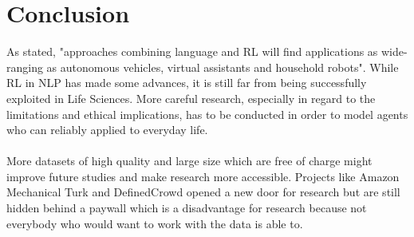 \documentclass[11pt,a4paper]{article}
\begin{document}
\section{Conclusion}
As \citet{luketina-2019-asurvey} stated, "approaches combining language and RL will find applications as wide-ranging as autonomous vehicles, virtual assistants and household robots". While RL in NLP has made some advances, it is still far from being successfully exploited in Life Sciences. More careful research, especially in regard to the limitations and ethical implications, has to be conducted in order to model agents who can reliably applied to everyday life. \\\\
More datasets of high quality and large size which are free of charge might improve future studies and make research more accessible. Projects like Amazon Mechanical Turk and DefinedCrowd opened a new door for research but are still hidden behind a paywall which is a disadvantage for research because not everybody who would want to work with the data is able to.

\newpage

\end{document}
